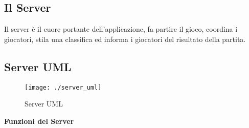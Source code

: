 \restoregeometry

\newpage

\subsection{Il Server}

\textsf{\normalsize Il server è il cuore portante dell'applicazione, fa partire il gioco, coordina i giocatori, stila una classifica ed informa i giocatori del risultato della partita.}

\subsection{Server UML}
\begin{figure}[p] %
	\centering
	\texttt{[image: ./server\_uml]}
	\caption{Server UML}
	\label{fig:server_uml}
\end{figure}


\textbf{\normalsize Funzioni del Server}

